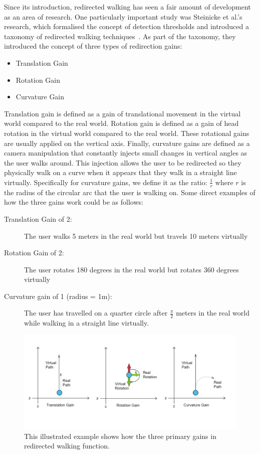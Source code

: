 Since its introduction, redirected walking has seen a fair amount of development as an area of research. One particularly important study was Steinicke et al.'s research, which formalised the concept of detection thresholds and introduced a taxonomy of redirected walking techniques~\cite{5072212}. As part of the taxonomy, they introduced the concept of three types of redirection gains:
\begin{itemize}
    \item Translation Gain
    \item Rotation Gain
    \item Curvature Gain
\end{itemize}

Translation gain is defined as a gain of translational movement in the virtual world compared to the real world. Rotation gain is defined as a gain of head rotation in the virtual world compared to the real world. These rotational gains are usually applied on the vertical axis. Finally, curvature gains are defined as a camera manipulation that constantly injects small changes in vertical angles as the user walks around. This injection allows the user to be redirected so they physically walk on a curve when it appears that they walk in a straight line virtually. Specifically for curvature gains, we define it as the ratio: $\frac{1}{r}$ where $r$ is the radius of the circular arc that the user is walking on. Some direct examples of how the three gains work could be as follows:
\begin{description}
    \item[Translation Gain of 2:] The user walks 5 meters in the real world but travels 10 meters virtually
    \item[Rotation Gain of 2:] The user rotates 180 degrees in the real world but rotates 360 degrees virtually
    \item[Curvature gain of 1 (radius = 1m):] The user has travelled on a quarter circle after $\frac{\pi}{2}$ meters in the real world while walking in a straight line virtually.
\end{description}

\begin{figure}[tbph]
    \centering
    \includegraphics[width=1.0\textwidth]{figures/graphs/redirectionGains.png}
    \caption[Illustrated Example of How Redirection Gains Function]{This illustrated example shows how the three primary gains in redirected walking function.}
    \label{fig:redirectionGainsExample}
\end{figure}

